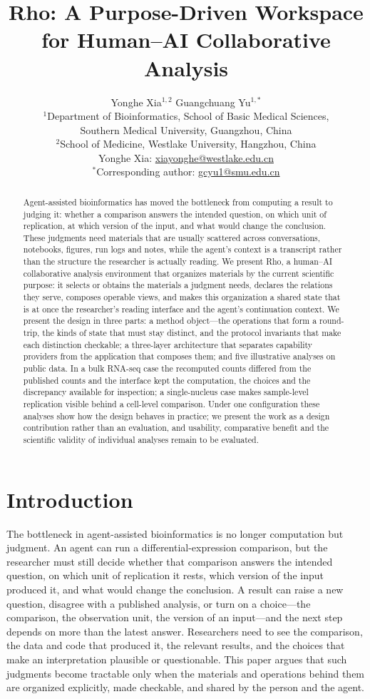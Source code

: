 \documentclass[11pt]{article}
\title{Rho: A Purpose-Driven Workspace for Human--AI Collaborative Analysis}
\author{%
  Yonghe Xia$^{1,2}$ \quad Guangchuang Yu$^{1,*}$\\[0.5em]
  \small $^{1}$Department of Bioinformatics, School of Basic Medical Sciences,\\
  \small Southern Medical University, Guangzhou, China\\
  \small $^{2}$School of Medicine, Westlake University, Hangzhou, China\\[0.4em]
  \small Yonghe Xia: \href{mailto:xiayonghe@westlake.edu.cn}{xiayonghe@westlake.edu.cn}\\
  \small $^{*}$Corresponding author: \href{mailto:gcyu1@smu.edu.cn}{gcyu1@smu.edu.cn}%
}
\date{}
\begin{document}
\maketitle
\begin{abstract}
Agent-assisted bioinformatics has moved the bottleneck from computing a result to judging it: whether a comparison answers the intended question, on which unit of replication, at which version of the input, and what would change the conclusion. These judgments need materials that are usually scattered across conversations, notebooks, figures, run logs and notes, while the agent's context is a transcript rather than the structure the researcher is actually reading. We present Rho, a human--AI collaborative analysis environment that organizes materials by the current scientific purpose: it selects or obtains the materials a judgment needs, declares the relations they serve, composes operable views, and makes this organization a shared state that is at once the researcher's reading interface and the agent's continuation context. We present the design in three parts: a method object---the operations that form a round-trip, the kinds of state that must stay distinct, and the protocol invariants that make each distinction checkable; a three-layer architecture that separates capability providers from the application that composes them; and five illustrative analyses on public data. In a bulk RNA-seq case the recomputed counts differed from the published counts and the interface kept the computation, the choices and the discrepancy available for inspection; a single-nucleus case makes sample-level replication visible behind a cell-level comparison. Under one configuration these analyses show how the design behaves in practice; we present the work as a design contribution rather than an evaluation, and usability, comparative benefit and the scientific validity of individual analyses remain to be evaluated.
\end{abstract}

\section{Introduction}\label{introduction}

The bottleneck in agent-assisted bioinformatics is no longer computation but judgment. An agent can run a differential-expression comparison, but the researcher must still decide whether that comparison answers the intended question, on which unit of replication it rests, which version of the input produced it, and what would change the conclusion. A result can raise a new question, disagree with a published analysis, or turn on a choice---the comparison, the observation unit, the version of an input---and the next step depends on more than the latest answer. Researchers need to see the comparison, the data and code that produced it, the relevant results, and the choices that make an interpretation plausible or questionable. This paper argues that such judgments become tractable only when the materials and operations behind them are organized explicitly, made checkable, and shared by the person and the agent.
\end{document}
